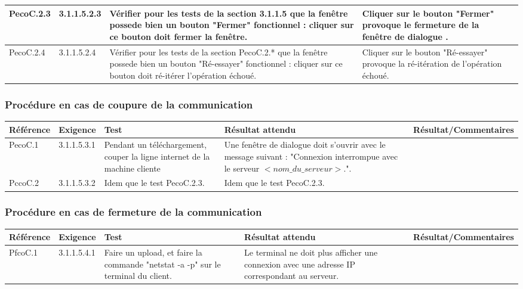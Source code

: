 \documentclass[10pt,a4paper,landscape]{report}
\begin{document}
\begin{center}
\begin{tabular}{|p{2.5cm}|p{2cm}|p{8cm}|p{8cm}|p{5.5cm}|}
		\hline
		PecoC.2.3 & 3.1.1.5.2.3 & Vérifier pour les tests de la section 3.1.1.5 que la fenêtre possede bien un bouton "Fermer" fonctionnel :  cliquer sur ce bouton doit fermer la fenêtre.& Cliquer sur le bouton "Fermer" provoque le fermeture de la fenêtre de dialogue .&\\
		\hline
		PecoC.2.4 & 3.1.1.5.2.4 & Vérifier pour les tests de la section PecoC.2.* que la fenêtre possede bien un bouton "Ré-essayer" fonctionnel :  cliquer sur ce bouton doit ré-itérer l'opération échoué.& Cliquer sur le bouton "Ré-essayer" provoque la ré-itération de l'opération échoué.&\\
		\hline
	\end{tabular}
	\egroup
\end{center}

\subsubsection{Procédure en cas de coupure de la communication}

\begin{center}
	\bgroup
	\def\arraystretch{1.5}
	\begin{tabular}{|p{2.5cm}|p{2cm}|p{8cm}|p{8cm}|p{5.5cm}|}
		\hline
		\rowcolor{gris}Référence & Exigence & Test & Résultat attendu & Résultat/Commentaires\\
		\hline
		PecoC.1 & 3.1.1.5.3.1 & Pendant un téléchargement, couper la ligne internet de la machine cliente & Une fenêtre de dialogue doit s'ouvrir avec le message suivant :   "Connexion interrompue avec le serveur $< nom\_du\_serveur>$.".&\\
		\hline
		PccoC.2 & 3.1.1.5.3.2 & Idem que le test PecoC.2.3. & Idem que le test PecoC.2.3.\\
		\hline
	\end{tabular}
	\egroup
\end{center}

\subsubsection{Procédure en cas de fermeture de la communication}

\begin{center}
	\bgroup
	\def\arraystretch{1.5}
	\begin{tabular}{|p{2.5cm}|p{2cm}|p{8cm}|p{8cm}|p{5.5cm}|}
		\hline
		\rowcolor{gris}Référence & Exigence & Test & Résultat attendu & Résultat/Commentaires\\
		\hline
		PfcoC.1 & 3.1.1.5.4.1 & Faire un upload, et faire la commande "netstat -a -p" sur le terminal du client. & Le terminal ne doit plus afficher une connexion avec une adresse IP correspondant au serveur.&\\
		\hline
	\end{tabular}
	\egroup
\end{center}
\end{document}
